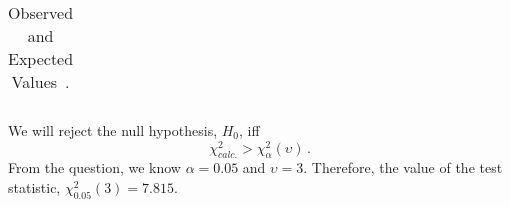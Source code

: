 \begin{subquestions}
\begin{subsubquestions}
\begin{table}[ht]
\begin{tabular}{|c|c|c|c|c|c|}
	\end{tabular}
	\caption{\label{2015:q4:tab:Chi} Observed and Expected Values \,.}
\end{table}

We will reject the null hypothesis, $H_0$, iff 
\begin{equation}
	\chi^2_{calc.} > \chi^2_{\alpha} (\upsilon)\,.
\end{equation}
 From the question, we know $\alpha= 0.05$ and $\upsilon = 3$. Therefore, the value of the test statistic, $\chi^2_{0.05}(3)=7.815$.
\end{subsubquestions}

\end{subquestions}


